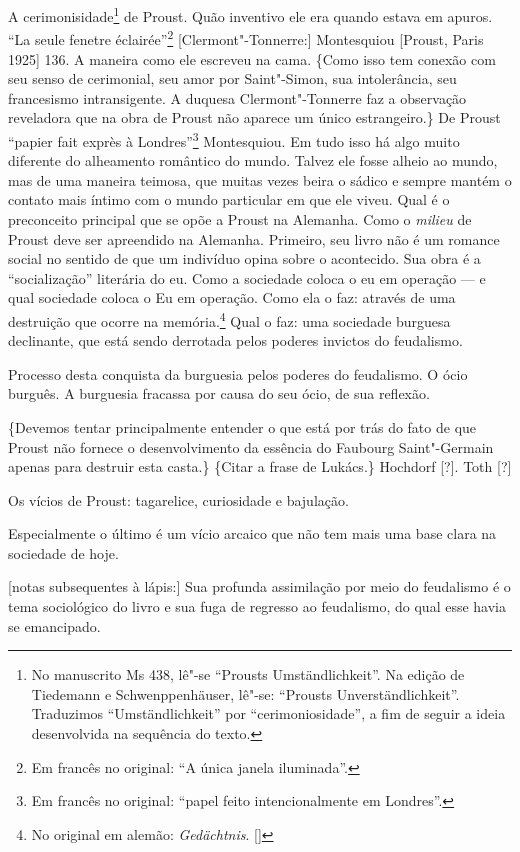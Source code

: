 A cerimonisidade\footnote{No manuscrito Ms 438, lê"-se ``Prousts
  Umständlichkeit''. Na edição de Tiedemann e Schwenppenhäuser, lê"-se:
  ``Prousts Unverständlichkeit''. Traduzimos ``Umständlichkeit'' por
  ``cerimoniosidade'', a fim de seguir a ideia desenvolvida na sequência
  do texto. \versal{[N.~T.]}} de Proust. Quão inventivo ele era quando estava em apuros.
``La seule fenetre éclairée''\footnote{Em francês no original: ``A
  única janela iluminada''. \versal{[N.~T.]}} {[}Clermont"-Tonnerre:{]} Montesquiou
{[}Proust, Paris 1925{]} 136. A maneira como ele escreveu na cama.
\{Como isso tem conexão com seu senso de cerimonial, seu amor por
Saint"-Simon, sua intolerância, seu francesismo intransigente. A duquesa
Clermont"-Tonnerre faz a observação reveladora que na obra de Proust não
aparece um único estrangeiro.\} De Proust ``papier fait exprès à
Londres''\footnote{Em francês no original: ``papel feito intencionalmente em Londres''. \versal{[N.~T.]}} Montesquiou. Em tudo isso há algo muito
diferente do alheamento romântico do mundo. Talvez ele fosse alheio ao
mundo, mas de uma maneira teimosa, que muitas vezes beira o sádico e
sempre mantém o contato mais íntimo com o mundo particular em que ele
viveu. Qual é o preconceito principal que se opõe a Proust na Alemanha.
Como o \emph{milieu} de Proust deve ser apreendido na Alemanha.
Primeiro, seu livro não é um romance social no sentido de que um
indivíduo opina sobre o acontecido. Sua obra é a ``socialização''
literária do eu. Como a sociedade coloca o eu em operação --- e qual
sociedade coloca o Eu em operação. Como ela o faz: através de uma
destruição que ocorre na memória.\footnote{No original em alemão: \emph{Gedächtnis}. []} Qual o faz: uma
sociedade burguesa declinante, que está sendo derrotada pelos poderes
invictos do feudalismo.

Processo desta conquista da burguesia pelos poderes do feudalismo. O
ócio burguês. A burguesia fracassa por causa do seu ócio, de sua
reflexão.

\{Devemos tentar principalmente entender o que está por trás do
fato de que Proust não fornece o desenvolvimento da essência do Faubourg
Saint"-Germain apenas para destruir esta casta.\} \{Citar a frase de
Lukács.\} Hochdorf {[}?{]}. Toth {[}?{]}

Os vícios de Proust: tagarelice, curiosidade e bajulação.

Especialmente o último é um vício arcaico que não tem mais uma base
clara na sociedade de hoje.

{[}notas subsequentes à lápis:{]} Sua profunda assimilação por meio do
feudalismo é o tema sociológico do livro e sua fuga de regresso ao
feudalismo, do qual esse havia se emancipado.

